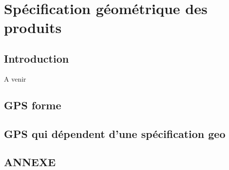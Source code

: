 \documentclass[
	11pt, %
	fleqn, %
	a4paper, %
]{LegrandOrangeBook}
\begin{document}

\chapter{Spécification géométrique des produits}
\section{Introduction}

A venir
\section{GPS forme}
\section{GPS qui dépendent d'une spécification geo}




\chapterspaceabove{6.25cm} %
\chapterspacebelow{7.5cm} %



	




\newpage
\section{ANNEXE}



{} %
\printindex %
\end{document}

